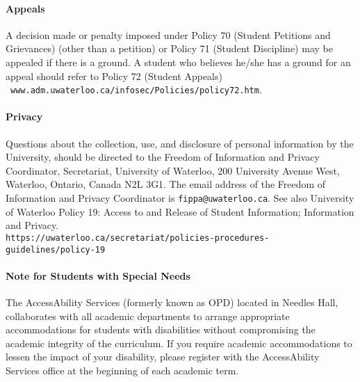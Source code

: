 \documentclass[letterpaper,10pt]{article}
\begin{document}
\paragraph{Appeals}
A decision made or penalty imposed under Policy 70 (Student Petitions and Grievances) (other than a petition) or Policy 71 (Student Discipline) may be appealed if there is a ground. A student who believes he/she has a ground for an appeal should refer to Policy 72 (Student Appeals)\\~\texttt{www.adm.uwaterloo.ca/infosec/Policies/policy72.htm}.

\paragraph{Privacy}
Questions about the collection, use, and disclosure of personal information by the University, should be directed to the Freedom of Information and Privacy Coordinator, Secretariat, University of Waterloo, 200 University Avenue West, Waterloo, Ontario, Canada N2L 3G1. The email address of the Freedom of Information and Privacy Coordinator is \texttt{fippa@uwaterloo.ca}. See also University of Waterloo Policy 19: Access to and Release of Student Information; Information and Privacy.
\\ \texttt{https://uwaterloo.ca/secretariat/policies-procedures-guidelines/policy-19}

\paragraph{Note for Students with Special Needs}
The AccessAbility Services (formerly known as OPD) located in Needles Hall, collaborates with all academic departments to arrange appropriate accommodations for students with disabilities without compromising the academic integrity of the curriculum. If you require academic accommodations to lessen the impact of your disability, please register with the AccessAbility Services office at the beginning of each academic term.
\end{document}
